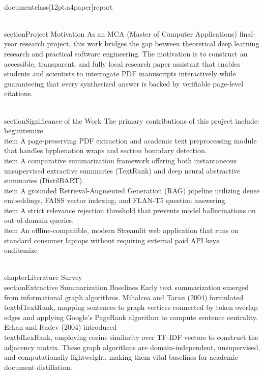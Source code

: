\\documentclass[12pt,a4paper]{report}
\begin{document}
\\section{Project Motivation}
As an MCA (Master of Computer Applications) final-year research project, this work bridges the gap between theoretical deep learning research and practical software engineering. The motivation is to construct an accessible, transparent, and fully local research paper assistant that enables students and scientists to interrogate PDF manuscripts interactively while guaranteeing that every synthesized answer is backed by verifiable page-level citations.

\\section{Significance of the Work}
The primary contributions of this project include:
\\begin{itemize}
    \\item A page-preserving PDF extraction and academic text preprocessing module that handles hyphenation wraps and section boundary detection.
    \\item A comparative summarization framework offering both instantaneous unsupervised extractive summaries (TextRank) and deep neural abstractive summaries (DistilBART).
    \\item A grounded Retrieval-Augmented Generation (RAG) pipeline utilizing dense embeddings, FAISS vector indexing, and FLAN-T5 question answering.
    \\item A strict relevance rejection threshold that prevents model hallucinations on out-of-domain queries.
    \\item An offline-compatible, modern Streamlit web application that runs on standard consumer laptops without requiring external paid API keys.
\\end{itemize}

\\chapter{Literature Survey}
\\section{Extractive Summarization Baselines}
Early text summarization emerged from informational graph algorithms. Mihalcea and Tarau (2004) formulated \\textbf{TextRank}, mapping sentences to graph vertices connected by token overlap edges and applying Google's PageRank algorithm to compute sentence centrality. Erkan and Radev (2004) introduced \\textbf{LexRank}, employing cosine similarity over TF-IDF vectors to construct the adjacency matrix. These graph algorithms are domain-independent, unsupervised, and computationally lightweight, making them vital baselines for academic document distillation.
\end{document}
